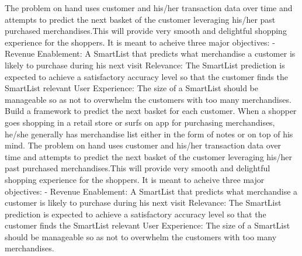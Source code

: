 The problem on hand uses customer and his/her transaction data over time and attempts to predict 
the next basket of the customer leveraging his/her past purchased merchandises.This will provide 
very smooth and delightful shopping experience for the shoppers. It is meant to acheive three major 
objectives: - Revenue Enablement: A SmartList that predicts what merchandise a customer is likely to 
purchase during his next visit Relevance: The SmartList prediction is expected to achieve a 
satisfactory accuracy level so that the customer finds the SmartList relevant User Experience: 
The size of a SmartList should be manageable so as not to overwhelm the customers with too many 
merchandises. Build a framework to predict the next basket for each customer.
When a shopper goes shopping in a retail store or surfs on app for purchasing merchandises, 
he/she generally has merchandise list either in the form of notes or on top of his mind. 
The problem on hand uses customer and his/her transaction data over time and attempts to predict 
the next basket of the customer leveraging his/her past purchased merchandises.This will provide 
very smooth and delightful shopping experience for the shoppers. It is meant to acheive three major 
objectives: - Revenue Enablement: A SmartList that predicts what merchandise a customer is likely to 
purchase during his next visit Relevance: The SmartList prediction is expected to achieve a 
satisfactory accuracy level so that the customer finds the SmartList relevant User Experience: 
The size of a SmartList should be manageable so as not to overwhelm the customers with too many 
merchandises.
